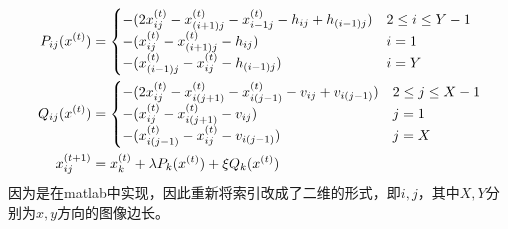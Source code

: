 \begin{align*}
P_{ij}(x^{(t)}) &= \begin{cases}
                            -(2x_{ij}^{(t)} - x_{(i+1)j}^{(t)} - x_{{i-1}j}^{(t)} - h_{ij} + h_{(i-1)j}) & 2 \le i \le Y-1 \\
                            -(x_{ij}^{(t)} - x_{(i+1)j}^{(t)} - h_{ij}) &  i = 1 \\
                            -(x_{(i-1)j}^{(t)} - x_{ij}^{(t)} - h_{(i-1)j}) &  i = Y
                        \end{cases}   \\
Q_{ij}(x^{(t)}) &= \begin{cases}
                            -(2x_{ij}^{(t)} - x_{i(j+1)}^{(t)} - x_{i(j-1)}^{(t)} - v_{ij} + v_{i(j-1)}) & 2 \le j \le X-1\\
                            -(x_{ij}^{(t)} - x_{i(j+1)}^{(t)} - v_{ij}) &  j = 1 \\
                            -(x_{i(j-1)}^{(t)} - x_{ij}^{(t)} - v_{i(j-1)}) &  j = X
                        \end{cases}  \\
x_{ij}^{(t+1)}&= x_k^{(t)} + \lambda P_k(x^{(t)}) + \xi Q_k(x^{(t)})
\end{align*}
因为是在matlab中实现，因此重新将索引改成了二维的形式，即$i,j$，其中$X,Y$分别为$x,y$方向的图像边长。

